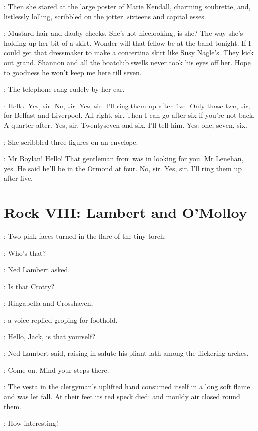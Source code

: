 :
Then she stared at the large poster of Marie Kendall,
charming soubrette,
and,
listlessly lolling,
scribbled on the jotter|
sixteens and capital esses.

\dunneint:
Mustard hair and dauby cheeks.
She's not nicelooking, is she?
The way she's holding up her bit of a skirt.
Wonder will that fellow be at the band tonight.
If I could get that dressmaker
to make a concertina skirt like Susy Nagle's.
They kick out grand.
Shannon and all the boatclub swells never took his eyes off her.
Hope to goodness
he won't keep me here till seven.

:
The telephone rang rudely by her ear.

\missdunne:
Hello.
Yes, sir.
No, sir.
Yes, sir.
I'll ring them up after five.
Only those two, sir, for Belfast and Liverpool.
All right, sir.
Then I can go after six if you're not back.
A quarter after.
Yes, sir.
Twentyseven and six.
I'll tell him.
Yes: one, seven, six.

:
She scribbled three figures on an envelope.

\missdunne:
Mr Boylan!
Hello!
That gentleman from  was in looking for you.
Mr Lenehan, yes.
He said he'll be in the Ormond at four.
No, sir.
Yes, sir.
I'll ring them up after five.


\section*{Rock VIII: Lambert and O'Molloy}


:
Two pink faces turned in the flare of the tiny torch.

\lambert:
Who's that?

:
Ned Lambert asked.

\lambert:
Is that Crotty?

\jjom:
Ringabella and Crosshaven,

:
a voice replied groping for foothold.

\lambert:
Hello, Jack, is that yourself?

:
Ned Lambert said,
raising in salute his pliant lath
among the flickering arches.

\lambert:
Come on.
Mind your steps there.

:
The vesta in the clergyman's uplifted hand consumed itself
in a long soft
flame and was let fall.
At their feet its red speck died:
and mouldy air
closed round them.

\revlove:
How interesting!

